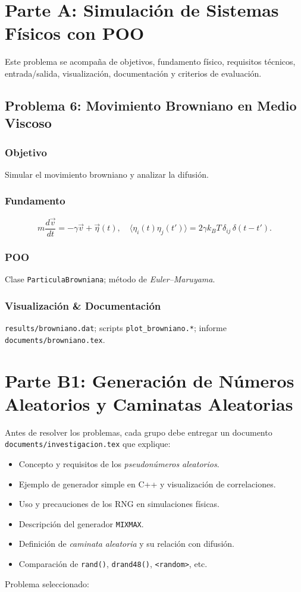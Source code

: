 \documentclass[11pt]{article}
\begin{document}
\section{Parte A: Simulación de Sistemas Físicos con POO}
Este problema se acompaña de objetivos, fundamento físico, requisitos técnicos, entrada/salida, visualización, documentación y criterios de evaluación.
\subsection{Problema 6: Movimiento Browniano en Medio Viscoso}

\subsubsection*{Objetivo}
Simular el movimiento browniano y analizar la difusión.

\subsubsection*{Fundamento}
\[
m\frac{d\vec v}{dt}= -\gamma\vec v + \vec\eta(t),\quad
\langle\eta_i(t)\eta_j(t')\rangle=2\gamma k_B T\,\delta_{ij}\,\delta(t-t').
\]

\subsubsection*{POO}
Clase \texttt{ParticulaBrowniana}; método de \emph{Euler–Maruyama}.

\subsubsection*{Visualización \& Documentación}
\texttt{results/browniano.dat}; scripts \texttt{plot\_browniano.*}; informe \texttt{documents/browniano.tex}.


\section{Parte B1: Generación de Números Aleatorios y Caminatas Aleatorias}

Antes de resolver los problemas, cada grupo debe entregar un documento \texttt{documents/investigacion.tex} que explique:
\begin{itemize}
  \item Concepto y requisitos de los \emph{pseudonúmeros aleatorios}.
  \item Ejemplo de generador simple en C++ y visualización de correlaciones.
  \item Uso y precauciones de los RNG en simulaciones físicas.
  \item Descripción del generador \texttt{MIXMAX}.
  \item Definición de \emph{caminata aleatoria} y su relación con difusión.
  \item Comparación de \texttt{rand()}, \texttt{drand48()}, \texttt{<random>}, etc.
\end{itemize}
Problema seleccionado:
\end{document}
